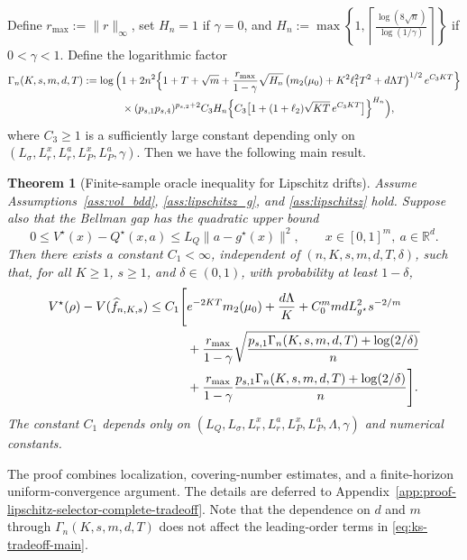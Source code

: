 \documentclass{article}
\newtheorem{thm}{Theorem}[section]
\newcommand{\1}{\mathbbm{1}}
\numberwithin{equation}{section}
\begin{document}
Define \(r_{\max}:=\|r\|_\infty\),
set 
 \(H_n=1\)
 if \(\gamma=0\),  and      $H_n
:=
\max\left\{
1,
\left\lceil
\frac{\log(8\sqrt n)}{\log(1/\gamma)}
\right\rceil
\right\}$
if \(0<\gamma<1\).
Define the logarithmic factor
\begin{align}
\label{eq:Gamma-section4}
\Gamma_n(K,s,m,d,T)
:=
\log\Big(&1+2n^2
\Big\{
1+T+\sqrt m
+\frac{r_{\max}}{1-\gamma}
\sqrt{H_n}
\left(m_2(\mu_0)+K^2\ell_1^2T^2+d\Lambda T\right)^{1/2}
e^{C_3KT}
\Big\}
\notag\\
&\times
(p_{s,1}p_{s,4})^{p_{s,2}+2}
C_3H_n
\Big\{
C_3\big[
1+(1+\ell_2)\sqrt{KT}\,e^{C_3KT}
\big]
\Big\}^{H_n}
\Big),
\end{align}
where \(C_3\ge1\) is a sufficiently large   constant
depending only on \((L_\sigma,L_r^x,L_r^a,L_P^x,L_P^a,\gamma)\).
Then we have the following main result.
\begin{thm}[Finite-sample oracle inequality for Lipschitz drifts]
\label{thm:lipschitz-selector-complete-tradeoff}
Assume Assumptions~\ref{ass:vol_bdd}, \ref{ass:lipschitsz_g}, and \ref{ass:lipschitsz} hold. Suppose also that the Bellman gap has the quadratic upper bound
\begin{equation}
\label{eq:quadratic-upper-gap-section4}
0\le V^\star(x)-Q^\star(x,a)
\le L_Q\|a-g^\star(x)\|^2,
\qquad x\in[0,1]^m,
\ a\in\mathbb R^d .
\end{equation}
Then there exists a constant \(C_1<\infty\), independent of \((n,K,s,m,d,T,\delta)\), such that, for all \(K\ge1\), \(s\ge1\), and \(\delta\in(0,1)\), with probability at least \(1-\delta\),
\begin{align}
\label{eq:ks-tradeoff-main}
 V^\star(\rho)-V(\widehat f_{n,K,s})
 \le C_1\Bigg[&
 e^{-2KT}m_2(\mu_0)+\frac{d\Lambda}{K}+C_0^m m d L_{g^\star}^2s^{-2/m}
\notag\\
&+\frac{r_{\max}}{1-\gamma}\sqrt{\frac{p_{s,1}\Gamma_n(K,s,m,d,T)+\log(2/\delta)}{n}}
\notag\\
&+\frac{r_{\max}}{1-\gamma}\frac{p_{s,1}\Gamma_n(K,s,m,d,T)+\log(2/\delta)}{n}
\Bigg].
\end{align}
The constant \(C_1\) depends only on \((L_Q,L_\sigma,L_r^x,L_r^a,L_P^x,L_P^a,\Lambda,\gamma)\) and numerical constants.
\end{thm}

The proof combines localization, covering-number estimates, and a
finite-horizon uniform-convergence argument. The details are deferred to Appendix~\ref{app:proof-lipschitz-selector-complete-tradeoff}. Note that the dependence on \(d\) and \(m\) through \(\Gamma_n(K,s,m,d,T)\) does not affect the leading-order terms in \eqref{eq:ks-tradeoff-main}.
\end{document}
